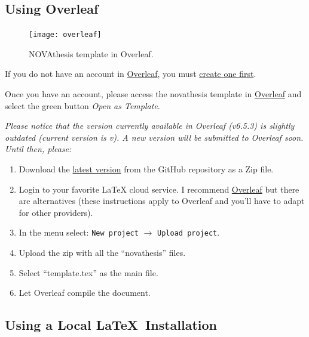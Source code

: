 \subsection{Using Overleaf}
\label{sub:using_overleaf}

\begin{figure}
\vspace*{-10ex}\texttt{[image: overleaf]}%
\caption{NOVAthesis template in Overleaf.}
\end{figure}

If you do not have an account in \href{https://www.overleaf.com?r=f5160636&rm=d&rs=b}{Overleaf}, you must \href{https://www.overleaf.com?r=f5160636&rm=d&rs=b}{create one first}.

Once you have an account, please access the \gls{novathesis} template in \href{https://www.overleaf.com/latex/templates/new-university-of-lisbon-universidade-nova-de-lisboa-slash-unl-thesis-template/fwbztcrptjmg}{Overleaf} and select the green button \emph{Open as Template}. 

\bgroup
  \itshape
  Please notice that the version currently available in Overleaf (v6.5.3) is slightly outdated (current version is v\novathesisversion). A new version will be submitted to Overleaf soon.  Until then, please:
  \begin{enumerate}
    \item Download the \href{https://github.com/joaomlourenco/novathesis/archive/master.zip}{latest version} from the GitHub repository as a Zip file.
    \item Login to your favorite LaTeX cloud service. I recommend \href{https://www.overleaf.com/?r=f5160636&rm=d&rs=b}{Overleaf} but there are alternatives (these instructions apply to Overleaf and you'll have to adapt for other providers).
    \item In the menu select: \texttt{New project} $\rightarrow$ \texttt{Upload project}.
    \item Upload the zip with all the “novathesis” files.
    \item Select “template.tex” as the main file.
    \item Let Overleaf compile the document.
  \end{enumerate}
\egroup

\subsection{Using a Local \LaTeX\ Installation}
\label{sub:using_local_latex}

